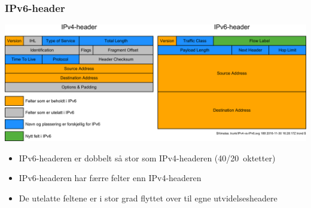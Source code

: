 \begin{frame}
  \frametitle{IPv6-header}
  \begin{center}
      {\includegraphics[scale=.17]{IPv4-vs-IPv6.pdf}}
  \end{center}

  \begin{itemize}
  \item IPv6-headeren er dobbelt så stor som IPv4-headeren
    (40/20~oktetter)
  \item IPv6-headeren har færre felter enn IPv4-headeren
  \item De utelatte feltene er i stor grad flyttet over til egne
    utvidelsesheadere
  \end{itemize}
\end{frame}

